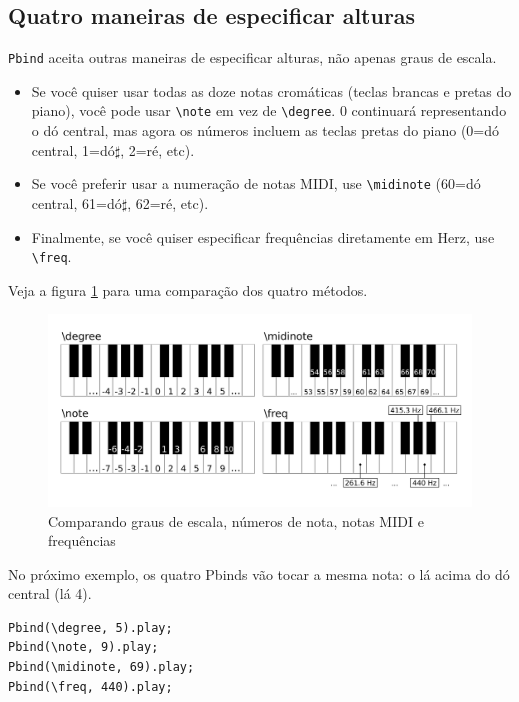 \subsection{Quatro maneiras de especificar alturas}

\texttt{Pbind} aceita outras maneiras de especificar alturas, não apenas graus de escala.
\begin{itemize}
\item Se você quiser usar todas as doze notas cromáticas (teclas brancas e pretas do piano), você pode usar \texttt{\textbackslash note} em vez de \texttt{\textbackslash degree}. 0 continuará representando o dó central, mas agora os números incluem as teclas pretas do piano (0=dó central, 1=dó$\sharp$, 2=ré, etc).
\item Se você preferir usar a numeração de notas MIDI, use \texttt{\textbackslash midinote} (60=dó central, 61=dó$\sharp$, 62=ré, etc).
\item Finalmente, se você quiser especificar frequências diretamente em Herz, use \texttt{\textbackslash freq}.
\end{itemize}

Veja a figura \ref{fig:scale-degrees} para uma comparação dos quatro métodos.

\begin{figure}[h]
\centering
\includegraphics[scale=0.4]{fig-piano-keyboard-degree-note-midinote-freq.png}
\caption{Comparando graus de escala, números de nota, notas MIDI e frequências}
\label{fig:scale-degrees}
\end{figure}

No próximo exemplo, os quatro Pbinds vão tocar a mesma nota: o lá acima do dó central (lá 4).

\begin{lstlisting}[style=SuperCollider-IDE, basicstyle=\scttfamily\footnotesize]
Pbind(\degree, 5).play;
Pbind(\note, 9).play;
Pbind(\midinote, 69).play;
Pbind(\freq, 440).play;
\end{lstlisting}


